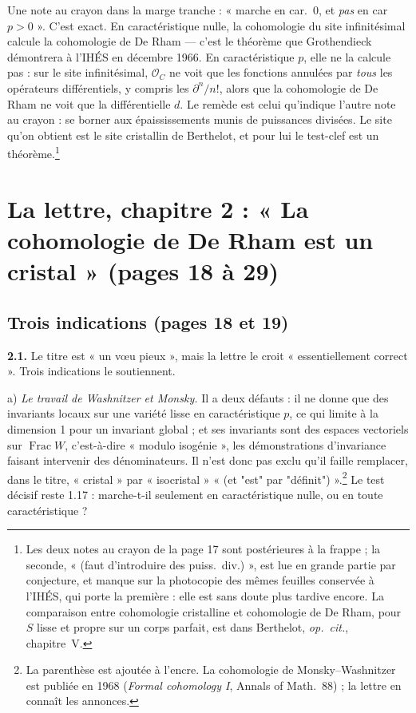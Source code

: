 \documentclass[11pt,a4paper]{article}
\begin{document}
Une note au crayon dans la marge tranche : « marche en car.~0, et \emph{pas}
en car $p > 0$ ». C'est exact. En caractéristique nulle, la cohomologie du
site infinitésimal calcule la cohomologie de De Rham — c'est le théorème que
Grothendieck démontrera à l'IHÉS en décembre 1966. En caractéristique $p$,
elle ne la calcule pas : sur le site infinitésimal, $\mathcal{O}_C$ ne voit que
les fonctions annulées par \emph{tous} les opérateurs différentiels, y compris
les $\partial^n/n!$, alors que la cohomologie de De Rham ne voit que la
différentielle $d$. Le remède est celui qu'indique l'autre note au crayon : se
borner aux épaississements munis de puissances divisées. Le site qu'on obtient
est le site cristallin de Berthelot, et pour lui le test-clef est un
théorème.\footnote{Les deux notes au crayon de la page 17 sont postérieures à
la frappe ; la seconde, « (faut d'introduire des puiss.\ div.) », est lue en
grande partie par conjecture, et manque sur la photocopie des mêmes feuilles
conservée à l'IHÉS, qui porte la première : elle est sans doute plus tardive
encore. La comparaison entre cohomologie cristalline et
cohomologie de De Rham, pour $S$ lisse et propre sur un corps parfait, est
dans Berthelot, \emph{op.\ cit.}, chapitre~V.}

\section*{La lettre, chapitre 2 : « La cohomologie de De Rham est un cristal » (pages 18 à 29)}

\subsection*{Trois indications (pages 18 et 19)}

\textbf{2.1.} Le titre est « un vœu pieux », mais la lettre le croit
« essentiellement correct ». Trois indications le soutiennent.

a) \emph{Le travail de Washnitzer et Monsky.} Il a deux défauts : il ne donne
que des invariants locaux sur une variété lisse en caractéristique $p$, ce qui
limite à la dimension 1 pour un invariant global ; et ses invariants sont des
espaces vectoriels sur $\operatorname{Frac}W$, c'est-à-dire « modulo
isogénie », les démonstrations d'invariance faisant intervenir des
dénominateurs. Il n'est donc pas exclu qu'il faille remplacer, dans le titre,
« cristal » par « isocristal » « (et "est" par "définit") ».\footnote{La
parenthèse est ajoutée à l'encre. La cohomologie de Monsky--Washnitzer est
publiée en 1968 (\emph{Formal cohomology I}, Annals of Math.\ 88) ; la lettre en
connaît les annonces.} Le test décisif reste 1.17 : marche-t-il seulement en
caractéristique nulle, ou en toute caractéristique ?
\end{document}
